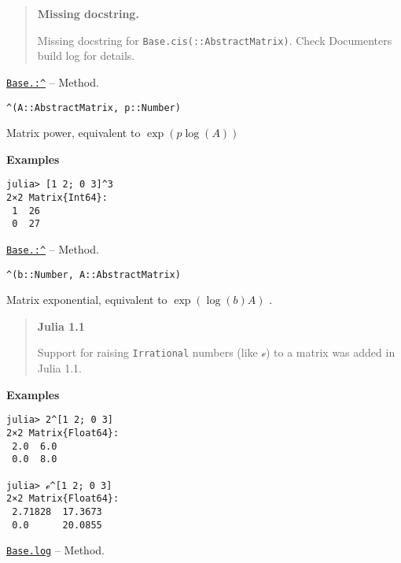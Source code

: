 \begin{quote}
\textbf{Missing docstring.}

Missing docstring for \texttt{Base.cis(::AbstractMatrix)}. Check Documenter{\textquotesingle}s build log for details.

\end{quote}

\hypertarget{9157107401023231344}{}
\hyperlink{9157107401023231344}{\texttt{Base.:{\textasciicircum}}}  -- {Method.}

\begin{adjustwidth}{2em}{0pt}


\begin{verbatim}
^(A::AbstractMatrix, p::Number)
\end{verbatim}

Matrix power, equivalent to  \(\exp(p\log(A))\)

\textbf{Examples}


\begin{verbatim}
julia> [1 2; 0 3]^3
2×2 Matrix{Int64}:
 1  26
 0  27
\end{verbatim}



\end{adjustwidth}
\hypertarget{717144866021034495}{}
\hyperlink{717144866021034495}{\texttt{Base.:{\textasciicircum}}}  -- {Method.}

\begin{adjustwidth}{2em}{0pt}


\begin{verbatim}
^(b::Number, A::AbstractMatrix)
\end{verbatim}

Matrix exponential, equivalent to  \(\exp(\log(b)A)\) .

\begin{quote}
\textbf{Julia 1.1}

Support for raising \texttt{Irrational} numbers (like \texttt{ℯ}) to a matrix was added in Julia 1.1.

\end{quote}
\textbf{Examples}


\begin{verbatim}
julia> 2^[1 2; 0 3]
2×2 Matrix{Float64}:
 2.0  6.0
 0.0  8.0

julia> ℯ^[1 2; 0 3]
2×2 Matrix{Float64}:
 2.71828  17.3673
 0.0      20.0855
\end{verbatim}



\end{adjustwidth}
\hypertarget{9092507796177351414}{}
\hyperlink{9092507796177351414}{\texttt{Base.log}}  -- {Method.}

